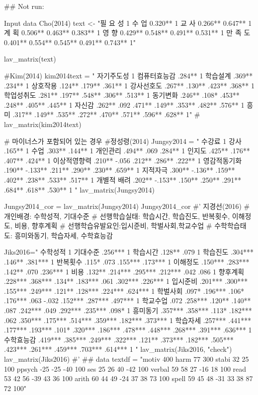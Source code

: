 \documentclass[a4paper]{book}
\begin{document}
\begin{Examples}
\begin{ExampleCode}
## Not run: 

Input data Cho(2014)
text <- "필 요 성 1
         수 업 0.320** 1
         교 사 0.266** 0.647** 1
         계 획 0.506** 0.463** 0.383** 1
         영 향 0.429** 0.548** 0.491** 0.531** 1
         만 족 도 0.401** 0.554** 0.545** 0.491** 0.743** 1"

lav_matrix(text)

#Kim(2014)
kim2014text = "
자기주도성  1
컴퓨터효능감 .284** 1
학습설계  .369** .234** 1
상호작용  .124** .179** .361** 1
강사선호도  .267** .130** .423** .368** 1
학업성취도  .281** .197** .548** .306** .513** 1
동기변화  .246** .108* .453** .248** .405** .445** 1
자신감  .262** .092 .471** .149** .353** .482** .576** 1
흥미  .317** .149** .535** .272** .470** .571** .596** .628** 1"
#
lav_matrix(kim2014text)

# 마이너스가 포함되어 있는 경우
#정성령(2014)
Jungsy2014 = "
수강료 1
강사 .165** 1
수업 .303** .144** 1
개인관리 .494** .069 .284** 1
인지도 .425** .176** .407** .424** 1
이상적영향력 .210** -.056 .212** .286** .222** 1
영감적동기화 .190** -.133** .211** .290** .230** .659** 1
지적자극 .300** -.136** .159** .402** .238** .533** .517** 1
개별적 배려 .202** -.153** .150** .250** .291** .684** .618** .530** 1
"
lav_matrix(Jungsy2014)

Jungsy2014_cor = lav_matrix(Jungsy2014)
Jungsy2014_cor
#'
지경선(2016)
# 개인배경: 수학성적, 기대수준
# 선행학습실태: 학습시간, 학습진도, 반복횟수, 이해정도, 비용, 향후계획
# 선행학습유발요인:입시준비, 학벌사회,학교수업
# 수학학습태도: 흥미와동기, 학습자세, 수학효능감


Jiks2016="
수학성적 1
기대수준 .256*** 1
학습시간 .128** .079 1
학습진도 .304*** .146** .381*** 1
반복횟수 .115* .073 .155*** .173*** 1
이해정도 .150*** .283*** .142** .070 .236*** 1
비용 .132** .214*** .295*** .212*** .042 .086 1
향후계획 .228*** .368*** .134** .183*** .061 .302*** .226*** 1
입시준비 .201*** .300*** .155*** .249*** .121** .128*** .224*** .624*** 1
학벌사회 .097* .196*** .106* .176*** .063 -.032 .152*** .287*** .497*** 1
학교수업 .072 .258*** .120** .140** .087 .242*** .049 .292*** .235*** .098* 1
흥미동기 .357*** .358*** .113* .182*** .062 .350*** .175*** .514*** .359*** .182*** .373*** 1
학습자세 .257*** .441*** .177*** .193*** .101* .320*** .186*** .478*** .448*** .268*** .391*** .636*** 1
수학효능감 .419*** .385*** .249*** .322*** .121** .373*** .182***
           .505*** .423*** .261*** .459*** .703*** .614*** 1
"
lav_matrix(Jiks2016, "check")
lav_matrix(Jiks2016)
#'
## data
textdf =  "motiv 400
harm      77  300
stabi     32   25   100
ppsych   -25  -25   -40    100
ses       25   26    40    -42 100
verbal    59   58    27    -16  18    100
read      53   42    56    -39  43     36  100
arith     60   44    49    -24  37     38   73   100
spell     59   45    48    -31  33     38   87    72   100"


\end{ExampleCode}
\end{Examples}
\end{document}
